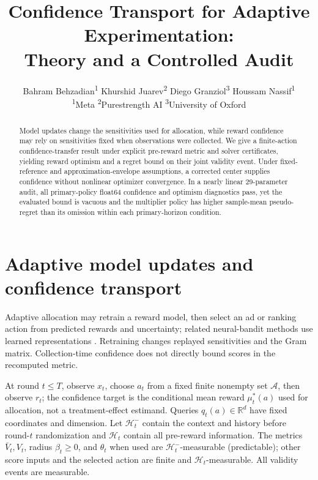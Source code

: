 \documentclass[10pt]{article}
\title{\vspace{-1.4em}\bfseries Confidence Transport for Adaptive Experimentation:\\Theory and a Controlled Audit\vspace{-0.35em}}
\author{Bahram Behzadian\textsuperscript{1}\quad
Khurshid Juarev\textsuperscript{2}\quad
Diego Granziol\textsuperscript{3}\quad
Houssam Nassif\textsuperscript{1}\\[-0.2em]
{\small \textsuperscript{1}Meta \quad
\textsuperscript{2}Purestrength AI \quad
\textsuperscript{3}University of Oxford}}
\date{}
\theoremstyle{definition}
\newcommand{\Vbar}{\bar V}
\newcommand{\R}{\mathbb R}
\begin{document}
\maketitle
\vspace{-2.1em}

\begin{abstract}
Model updates change the sensitivities used for allocation, while
reward confidence may rely on sensitivities fixed when observations
were collected. We give a finite-action confidence-transfer result
under explicit pre-reward metric and solver certificates, yielding
reward optimism and a regret bound on their joint validity event.
Under fixed-reference and approximation-envelope assumptions, a
corrected center supplies confidence without nonlinear optimizer convergence.
In a nearly linear 29-parameter audit, all primary-policy float64 confidence
and optimism diagnostics pass, yet the evaluated bound is vacuous and the
multiplier policy has higher sample-mean pseudo-regret than its omission
within each primary-horizon condition.
\end{abstract}
\vspace{-0.4em}

\section{Adaptive model updates and confidence transport}
Adaptive allocation may retrain a reward model, then select an ad or ranking action from predicted rewards and uncertainty; related neural-bandit methods use learned representations \cite{zhou2020neural,riquelme2018deep}. Retraining changes replayed sensitivities and the Gram matrix. Collection-time confidence does not directly bound scores in the recomputed metric.

At round $t\le T$, observe $x_t$, choose $a_t$ from a fixed finite
nonempty set $\mathcal A$, then observe $r_t$; the confidence target is
the conditional mean reward $\mu_t^*(a)$ used for allocation, not a
treatment-effect estimand. Queries $q_t(a)\in\R^d$ have fixed coordinates
and dimension. Let $\mathcal H_t^-$ contain the context and history before
round-$t$ randomization and $\mathcal H_t$ contain all pre-reward
information. The metrics $\Vbar_t,V_t$, radius $\beta_t\ge0$, and
$\theta_t$ when used are $\mathcal H_t^-$-measurable (predictable);
other score inputs and the selected action are finite and
$\mathcal H_t$-measurable. All validity events are measurable.
\end{document}
